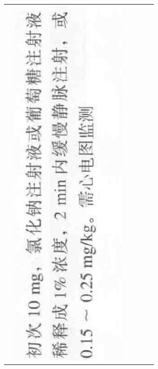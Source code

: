 \documentclass[10pt]{article}
\begin{document}
\begin{center}
\begin{tabular}{|c|c|c|c|c|c|}
 & \includegraphics[max width=\textwidth]{2024_07_05_645bb794a4d4f32ee0c8g-352(15)}

\end{tabular}
\end{center}
\end{document}
